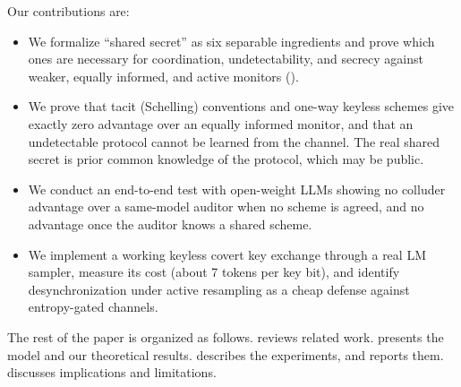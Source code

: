 Our contributions are:
\begin{itemize}[leftmargin=*,itemsep=0pt,topsep=0pt]
    \item We formalize ``shared secret'' as six separable ingredients and prove which ones are necessary for coordination, undetectability, and secrecy against weaker, equally informed, and active monitors ().
    \item We prove that tacit (Schelling) conventions and one-way keyless schemes give exactly zero advantage over an equally informed monitor, and that an undetectable protocol cannot be learned from the channel. The real shared secret is prior common knowledge of the protocol, which may be public.
    \item We conduct an end-to-end test with open-weight LLMs showing no colluder advantage over a same-model auditor when no scheme is agreed, and no advantage once the auditor knows a shared scheme.
    \item We implement a working keyless covert key exchange through a real LM sampler, measure its cost (about 7 tokens per key bit), and identify desynchronization under active resampling as a cheap defense against entropy-gated channels.
\end{itemize}

The rest of the paper is organized as follows.  reviews related work.  presents the model and our theoretical results.  describes the experiments, and  reports them.  discusses implications and limitations.

